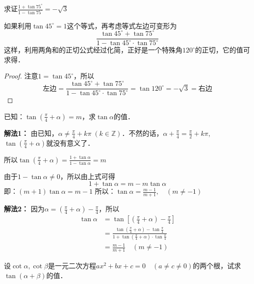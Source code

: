 \begin{example}
求证$\frac{1+\tan 75^{\circ}}{1-\tan 75^{\circ}}=-\sqrt{3}$
\end{example}

\begin{analyze}
如果利用$\tan45^{\circ}=1$这个等式，再考虑等式左边可变形为
\[\frac{\tan 45^{\circ}+\tan 75^{\circ}}{1-\tan 45^{\circ}\cdot \tan 75^{\circ}}\]
这样，利用两角和的正切公式经过化简，正好是一个特殊角$120^{\circ}$的正切，它的值可求得．
\end{analyze}

\begin{proof}
注意$1=\tan 45^{\circ}$，所以
\[\text{左边}=\frac{\tan 45^{\circ}+\tan 75^{\circ}}{1-\tan 45^{\circ}\cdot \tan 75^{\circ}}=\tan 120^{\circ}=-\sqrt{3}=\text{右边}\]
\end{proof}


\begin{example}
    已知：$\tan\left(\frac{\pi}{4}+\alpha\right)=m$，求$\tan\alpha$的值．
\end{example}

\begin{solution}
\textbf{解法1：} 由已知，$\alpha\ne \frac{\pi}{4}+k\pi\; (k\in\mathbb{Z})$．不然的话，$\alpha+\frac{\pi}{4}=\frac{\pi}{2}+k\pi$, $\tan\left(\frac{\pi}{4}+\alpha\right)$就没有意义了．

所以$\tan\left(\frac{\pi}{4}+\alpha\right)=\frac{1+\tan\alpha}{1-\tan\alpha}=m$

由于$1-\tan\alpha\ne 0$，所以由上式可得
\[1+\tan\alpha=m-m\tan\alpha\]
即：$(m+1)\tan\alpha=m-1$
所以：$\tan\alpha=\frac{m-1}{m+1},\quad (m\ne -1)$

\textbf{解法2：} 因为$\alpha=\left(\frac{\pi}{4}+\alpha\right)-\frac{\pi}{4}$，所以
\[\begin{split}
   \tan \alpha&=\tan\left[\left(\frac{\pi}{4}+\alpha\right)-\frac{\pi}{4}\right] \\
   &=\frac{\tan\left(\frac{\pi}{4}+\alpha\right)-\tan\frac{\pi}{4}}{1+\tan\left(\frac{\pi}{4}+\alpha\right)\cdot \tan\frac{\pi}{4}}\\
   &=\frac{m-1}{m+1}\quad (m\ne -1)
\end{split}\]
\end{solution}



\begin{example}
设$\cot\alpha, \cot\beta$是一元二次方程$ax^2+bx+c=0\quad (a\ne c\ne 0)$的两个根，试求$\tan (\alpha+\beta)$的值．
\end{example}

